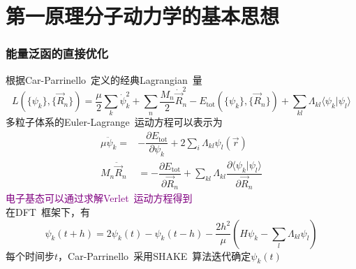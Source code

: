 \documentclass[cjk,slidestop,compress,mathserif,blue]{beamer}
\begin{document}
\section{第一原理分子动力学的基本思想}
\frame
{
	\frametitle{能量泛函的直接优化}
	根据\textrm{Car-Parrinello~}定义的经典\textrm{Lagrangian~}量
	{\fontsize{9.0pt}{5.2pt}\selectfont
	\begin{displaymath}
		L(\{\psi_k\},\{\vec R_n\})=\frac{\mu}2\sum_k\dot{\psi}_k^2+\sum_n\frac{M_n}2\dot{\vec R}_n^2-E_{\mathrm{tot}}(\{\psi_k\},\{\vec R_n\})+\sum_{kl}\Lambda_{kl}\langle\psi_k|\psi_l\rangle
	\end{displaymath}}
	多粒子体系的\textrm{Euler-Lagrange~}运动方程可以表示为
	\begin{displaymath}
		\begin{aligned}
			\mu\ddot{\psi}_k=&-\dfrac{\partial E_{\mathrm{tot}}}{\partial\psi_k}+2\sum_i\Lambda_{kl}\psi_l(\vec r)\\
			M_n\ddot{\vec R}_n&=-\dfrac{\partial E_{\mathrm{tot}}}{\partial\vec R_n}+\sum_{kl}\Lambda_{kl}\dfrac{\partial\langle\psi_k|\psi_l\rangle}{\partial\vec R_n}
		\end{aligned}
	\end{displaymath}
	\textcolor{purple}{电子基态可以通过求解\textrm{Verlet~}运动方程得到}\\
	在\textrm{DFT~}框架下，有
	{\fontsize{9.0pt}{5.2pt}\selectfont
	\begin{displaymath}
		\psi_k(t+h)=2\psi_k(t)-\psi_k(t-h)-\dfrac{2h^2}{\mu}(H\psi_k-\sum_l\Lambda_{kl}\psi_l)
	\end{displaymath}}
	每个时间步$t$，\textrm{Car-Parrinello~}采用\textrm{SHAKE~}算法迭代确定$\psi_k(t)$
}
\end{document}
